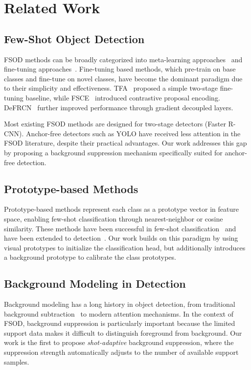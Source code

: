 \documentclass[10pt,twocolumn,letterpaper]{article}
\begin{document}
\section{Related Work}
\label{sec:related}

\subsection{Few-Shot Object Detection}

FSOD methods can be broadly categorized into meta-learning approaches~\cite{kang2019few,wang2020few}
and fine-tuning approaches~\cite{wang2020few,yan2019fsce}.
Fine-tuning based methods, which pre-train on base classes and fine-tune on novel classes,
have become the dominant paradigm due to their simplicity and effectiveness.
TFA~\cite{wang2020few} proposed a simple two-stage fine-tuning baseline,
while FSCE~\cite{sun2021defrcn} introduced contrastive proposal encoding.
DeFRCN~\cite{qiao2021defrcn} further improved performance through gradient decoupled layers.

Most existing FSOD methods are designed for two-stage detectors (Faster R-CNN).
Anchor-free detectors such as YOLO have received less attention in the FSOD literature,
despite their practical advantages. Our work addresses this gap by proposing a
background suppression mechanism specifically suited for anchor-free detection.

\subsection{Prototype-based Methods}

Prototype-based methods represent each class as a prototype vector in feature space,
enabling few-shot classification through nearest-neighbor or cosine similarity.
These methods have been successful in few-shot classification~\cite{snell2017prototypical}
and have been extended to detection~\cite{li2021few}.
Our work builds on this paradigm by using visual prototypes to initialize the
classification head, but additionally introduces a background prototype to
calibrate the class prototypes.

\subsection{Background Modeling in Detection}

Background modeling has a long history in object detection, from traditional
background subtraction~\cite{piccardi2004background} to modern attention mechanisms.
In the context of FSOD, background suppression is particularly important because
the limited support data makes it difficult to distinguish foreground from background.
Our work is the first to propose \emph{shot-adaptive} background suppression,
where the suppression strength automatically adjusts to the number of available
support samples.
\end{document}
